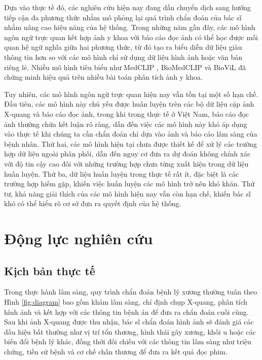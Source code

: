 Dựa vào thực tế đó, các nghiên cứu hiện nay đang dần chuyển dịch sang hướng tiếp cận đa phương thức nhằm mô phỏng lại quá trình chẩn đoán của bác sĩ nhằm nâng cao hiệu năng của hệ thống. Trong những năm gần đây, các mô hình ngôn ngữ trực quan kết hợp ảnh y khoa với báo cáo đọc ảnh có thể học được mối quan hệ ngữ nghĩa giữa hai phương thức, từ đó tạo ra biểu diễn dữ liệu giàu thông tin hơn so với các mô hình chỉ sử dụng dữ liệu hình ảnh hoặc văn bản riêng lẻ. Nhiều mô hình tiêu biểu như MedCLIP \cite{MedCLIP}, BioMedCLIP \cite{BiomedCLIP} và BioViL \cite{BioViL} đã chứng minh hiệu quả trên nhiều bài toán phân tích ảnh y khoa.

Tuy nhiên, các mô hình ngôn ngữ trực quan hiện nay vẫn tồn tại một số hạn chế. Đầu tiên, các mô hình này chủ yếu được huấn luyện trên các bộ dữ liệu cặp ảnh X-quang và báo cáo đọc ảnh, trong khi trong thực tế ở Việt Nam, báo cáo đọc ảnh thường chứa kết luận rõ ràng, dẫn đến việc các mô hình này khó áp dụng vào thực tế khi chúng ta cần chẩn đoán chỉ dựa vào ảnh và báo cáo lâm sàng của bệnh nhân. Thứ hai, các mô hình hiện tại chưa được thiết kế để xử lý các trường hợp dữ liệu ngoài phân phối, dẫn đến nguy cơ đưa ra dự đoán không chính xác với độ tin cậy cao đối với những trường hợp chưa từng xuất hiện trong dữ liệu huấn luyện. Thứ ba, dữ liệu huấn luyện trong thực tế rất ít, đặc biệt là các trường hợp hiếm gặp, khiến việc huấn luyện các mô hình trở nên khó khăn. Thứ tư, khả năng giải thích của các mô hình hiện nay vẫn còn hạn chế, khiến bác sĩ khó có thể hiểu rõ cơ sở đưa ra quyết định của hệ thống.

\section{Động lực nghiên cứu}
\subsection{Kịch bản thực tế}

Trong thực hành lâm sàng, quy trình chẩn đoán bệnh lý xương thường tuân theo Hình \ref{fig:diagram} bao gồm khám lâm sàng, chỉ định chụp X-quang, phân tích hình ảnh và kết hợp với các thông tin bệnh án để đưa ra chẩn đoán cuối cùng. Sau khi ảnh X-quang được thu nhận, bác sĩ chẩn đoán hình ảnh sẽ đánh giá các dấu hiệu bất thường như vị trí tổn thương, hình thái gãy xương, khối u hoặc các biến đổi bệnh lý khác, đồng thời đối chiếu với các thông tin lâm sàng như triệu chứng, tiền sử bệnh và cơ chế chấn thương để đưa ra kết quả đọc phim.

